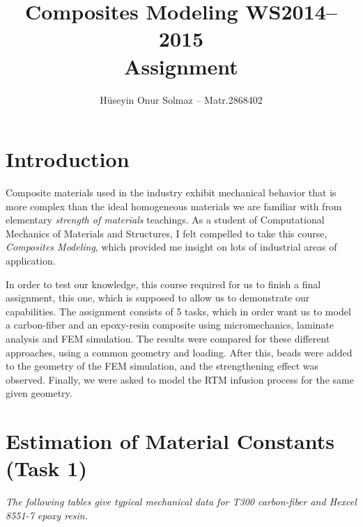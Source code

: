 \documentclass[a4paper,twosided,11pt,DIV14]{scrartcl}
\title{Composites Modeling WS2014--2015\\Assignment}
\author{Hüseyin Onur Solmaz -- Matr.2868402}
\date{}
\begin{document}
\maketitle
\tableofcontents

\section{Introduction}

Composite materials used in the industry exhibit mechanical behavior that is
more complex than the ideal homogeneous materials we are familiar with from
elementary \emph{strength of materials} teachings. As a student of
Computational Mechanics of Materials and Structures, I felt compelled to take
this course, \emph{Composites Modeling}, which provided me insight on lots of
industrial areas of application.

In order to test our knowledge, this course required for us to finish a final
assignment, this one, which is supposed to allow us to demonstrate our
capabilities. The assignment consists of 5 tasks, which in order want us to
model a carbon-fiber and an epoxy-resin composite using micromechanics, laminate
analysis and FEM simulation. The results were compared for these different
approaches, using a common geometry and loading. After this, beads were added to
the geometry of the FEM simulation, and the strengthening effect was observed.
Finally, we were asked to model the RTM infusion process for the same given
geometry.

\section{Estimation of Material Constants (Task 1)}

\textit{The following tables give typical mechanical data for T300 carbon-fiber and
Hexcel 8551-7 epoxy resin.}
\end{document}
